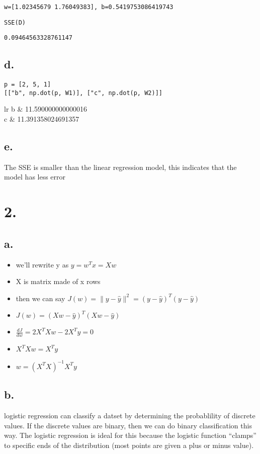 \documentclass[11pt]{article}
\begin{document}
\begin{verbatim}
w=[1.02345679 1.76049383], b=0.5419753086419743
\end{verbatim}

\begin{verbatim}
SSE(D)
\end{verbatim}

\begin{verbatim}
0.09464563328761147
\end{verbatim}
\subsection*{d.}
\label{sec:orga985df5}
\begin{verbatim}
p = [2, 5, 1]
[["b", np.dot(p, W1)], ["c", np.dot(p, W2)]]

\end{verbatim}

\begin{center}
\begin{tabular2}{lr}
b & 11.590000000000016\\[0pt]
c & 11.391358024691357\\[0pt]
\end{tabular2}
\end{center}
\subsection*{e.}
\label{sec:orgb7ab1f7}
The SSE is smaller than the linear regression model, this indicates that the
model has less error
\section*{2.}
\label{sec:orgf818dc7}
\subsection*{a.}
\label{sec:org5c3d16d}
\begin{itemize}
\item we'll rewrite y as \(y = w^Tx = Xw\)
\item X is matrix made of x rows
\item then we can say \(J(w) = \|y-\hat y\|^2 = (y-\hat y)^T(y - \hat y)\)
\item \(J(w) = (Xw-\hat y)^T(Xw - \hat y)\)
\item \(\frac{dJ}{dw} = 2X^TXw - 2X^Ty = 0\)
\item \(X^TXw = X^Ty\)
\item \(w = (X^TX)^{-1}X^Ty\)
\end{itemize}
\subsection*{b.}
\label{sec:org92a3147}
logistic regression can classify a datset by determining the probablility of
discrete values. If the discrete values are binary, then we can do binary
classification this way. The logistic regression is ideal for this because the
logistic function ``clamps'' to specific ends of the distribution (most points are
given a plus or minus value).
\end{document}
